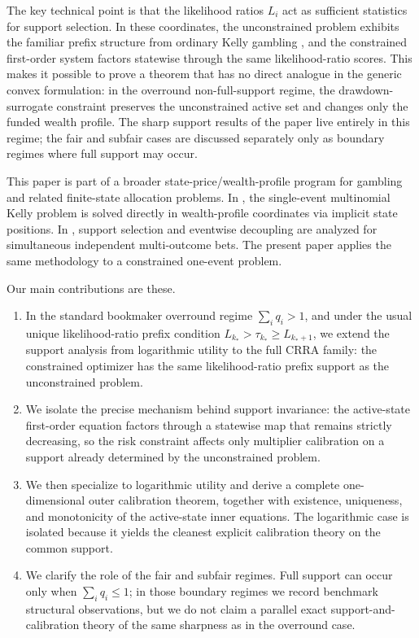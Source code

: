 \documentclass[11pt]{article}
\theoremstyle{definition}
\theoremstyle{remark}
\newcommand{\1}{\mathbf{1}}
\begin{document}
The key technical point is that the likelihood ratios $L_i$ act as sufficient statistics for support selection. In these coordinates, the unconstrained problem exhibits the familiar prefix structure from ordinary Kelly gambling \cite{Kelly1956}, and the constrained first-order system factors statewise through the same likelihood-ratio scores. This makes it possible to prove a theorem that has no direct analogue in the generic convex formulation: in the overround non-full-support regime, the drawdown-surrogate constraint preserves the unconstrained active set and changes only the funded wealth profile. The sharp support results of the paper live entirely in this regime; the fair and subfair cases are discussed separately only as boundary regimes where full support may occur.

This paper is part of a broader state-price/wealth-profile program for gambling and related finite-state allocation problems. In \cite{Long2026Implicit}, the single-event multinomial Kelly problem is solved directly in wealth-profile coordinates via implicit state positions. In \cite{Long2026Support}, support selection and eventwise decoupling are analyzed for simultaneous independent multi-outcome bets. The present paper applies the same methodology to a constrained one-event problem.

Our main contributions are these.
\begin{enumerate}[label=\textnormal{(\roman*)},leftmargin=*]
\item In the standard bookmaker overround regime $\sum_i q_i>1$, and under the usual unique likelihood-ratio prefix condition $L_{k_*}>\tau_{k_*}\ge L_{k_*+1}$, we extend the support analysis from logarithmic utility to the full CRRA family: the constrained optimizer has the same likelihood-ratio prefix support as the unconstrained problem.
\item We isolate the precise mechanism behind support invariance: the active-state first-order equation factors through a statewise map that remains strictly decreasing, so the risk constraint affects only multiplier calibration on a support already determined by the unconstrained problem.
\item We then specialize to logarithmic utility and derive a complete one-dimensional outer calibration theorem, together with existence, uniqueness, and monotonicity of the active-state inner equations. The logarithmic case is isolated because it yields the cleanest explicit calibration theory on the common support.
\item We clarify the role of the fair and subfair regimes. Full support can occur only when $\sum_i q_i\le 1$; in those boundary regimes we record benchmark structural observations, but we do not claim a parallel exact support-and-calibration theory of the same sharpness as in the overround case.
\end{enumerate}
\end{document}
